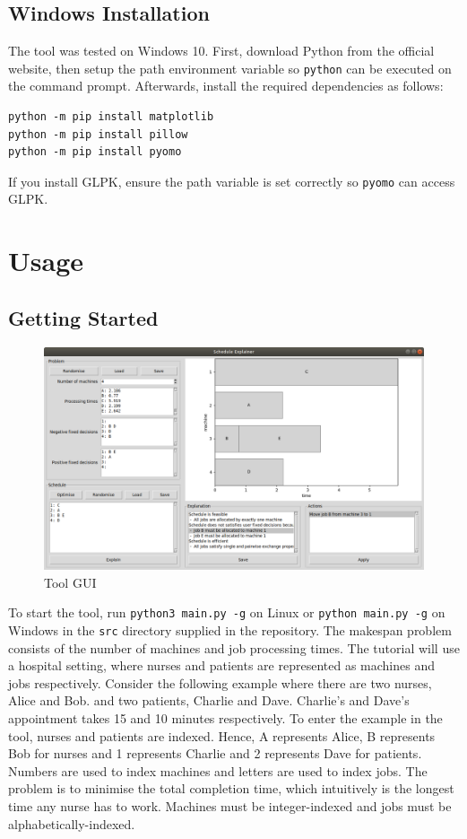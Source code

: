 \subsection{Windows Installation}

The tool was tested on Windows 10. First, download Python from the official website, then setup the path environment variable so \texttt{python} can be executed on the command prompt. Afterwards, install the required dependencies as follows:

\begin{verbatim}
python -m pip install matplotlib
python -m pip install pillow
python -m pip install pyomo
\end{verbatim}

If you install GLPK, ensure the path variable is set correctly so \texttt{pyomo} can access GLPK.

\section{Usage}

\subsection{Getting Started}

\begin{figure}[H]
	\centering
	\includegraphics[width=\linewidth]{figures/tool_gui.png}
	\caption{Tool GUI}
\end{figure}

To start the tool, run \texttt{python3 main.py -g} on Linux or \texttt{python main.py -g} on Windows in the \texttt{src} directory supplied in the repository.
\linespace
The makespan problem consists of the number of machines and job processing times. The tutorial will use a hospital setting, where nurses and patients are represented as machines and jobs respectively. Consider the following example where there are two nurses, Alice and Bob. and two patients, Charlie and Dave. Charlie's and Dave's appointment takes 15 and 10 minutes respectively. To enter the example in the tool, nurses and patients are indexed. Hence, A represents Alice, B represents Bob for nurses and 1 represents Charlie and 2 represents Dave for patients. Numbers are used to index machines and letters are used to index jobs. The problem is to minimise the total completion time, which intuitively is the longest time any nurse has to work. Machines must be integer-indexed and jobs must be alphabetically-indexed.

